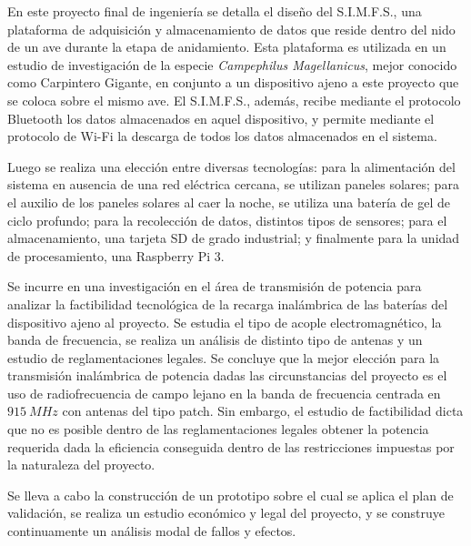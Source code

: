 

En este proyecto final de ingeniería se detalla el diseño del S.I.M.F.S., una plataforma de adquisición y almacenamiento de datos que reside dentro del nido de un ave durante la etapa de anidamiento. Esta plataforma es utilizada en un estudio de investigación de la especie \textit{Campephilus Magellanicus}, mejor conocido como Carpintero Gigante, en conjunto a un dispositivo ajeno a este proyecto que se coloca sobre el mismo ave. El S.I.M.F.S., además, recibe mediante el protocolo Bluetooth los datos almacenados en aquel dispositivo, y permite mediante el protocolo de Wi-Fi la descarga de todos los datos almacenados en el sistema. 

Luego se realiza una elección entre diversas tecnologías: para la alimentación del sistema en ausencia de una red eléctrica cercana, se utilizan paneles solares; para el auxilio de los paneles solares al caer la noche, se utiliza una batería de gel de ciclo profundo; para la recolección de datos, distintos tipos de sensores; para el almacenamiento, una tarjeta SD de grado industrial; y finalmente para la unidad de procesamiento, una Raspberry Pi 3.

Se incurre en una investigación en el área de transmisión de potencia para analizar la factibilidad tecnológica de la recarga inalámbrica de las baterías del dispositivo ajeno al proyecto. Se estudia el tipo de acople electromagnético, la banda de frecuencia, se realiza un análisis de distinto tipo de antenas y un estudio de reglamentaciones legales. Se concluye que la mejor elección para la transmisión inalámbrica de potencia dadas las circunstancias del proyecto es el uso de radiofrecuencia de campo lejano en la banda de frecuencia centrada en $915 \ MHz$ con antenas del tipo patch. Sin embargo, el estudio de factibilidad dicta que no es posible dentro de las reglamentaciones legales obtener la potencia requerida dada la eficiencia conseguida dentro de las restricciones impuestas por la naturaleza del proyecto.


Se lleva a cabo la construcción de un prototipo sobre el cual se aplica el plan de validación, se realiza un estudio económico y legal del proyecto, y se construye continuamente un análisis modal de fallos y efectos.



